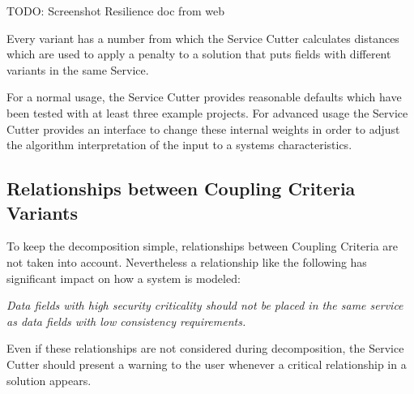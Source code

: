 TODO: Screenshot Resilience doc from web

Every variant has a number from which the Service Cutter calculates distances which are used to apply a penalty to a solution that puts fields with different variants in the same Service. 

For a normal usage, the Service Cutter provides reasonable defaults which have been tested with at least three example projects. For advanced usage the Service Cutter provides an interface to change these internal weights in order to adjust the algorithm interpretation of the input to a systems characteristics. 

\subsection{Relationships between Coupling Criteria Variants}

To keep the decomposition simple, relationships between Coupling Criteria are not taken into account. Nevertheless a relationship like the following has significant impact on how a system is modeled:

\textit{Data fields with high security criticality should not be placed in the same service as data fields with low consistency requirements.}

Even if these relationships are not considered during decomposition, the Service Cutter should present a warning to the user whenever a critical relationship in a solution appears.
